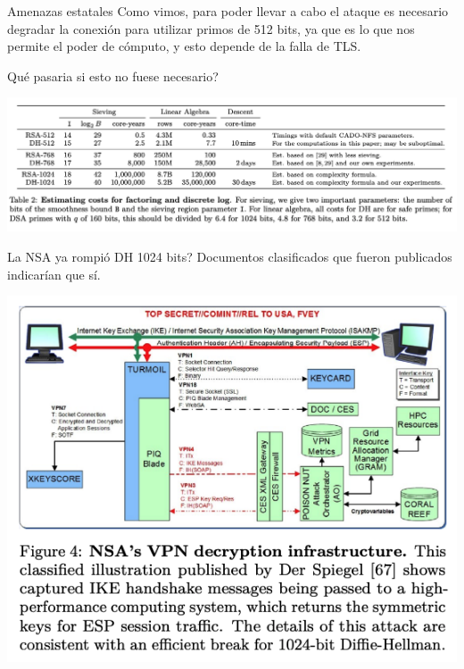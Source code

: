 \documentclass{beamer}
\begin{document}
\begin{frame}{Amenazas estatales}
    Como vimos, para poder llevar a cabo el ataque es necesario degradar la conexión para utilizar primos de 512 bits, ya que es lo que nos permite el poder de cómputo, y esto depende de la falla de TLS. 

    Qué pasaria si esto no fuese necesario?
    \begin{center}
        \includegraphics[scale=0.3]{figure3_dh.png}
    \end{center}
\end{frame}

\begin{frame}{La NSA ya rompió DH 1024 bits?}
    Documentos clasificados que fueron publicados indicarían que sí.


    \begin{center}
        \includegraphics[scale=0.4]{figure4_dh.png}
    \end{center}

\end{frame}
\end{document}
